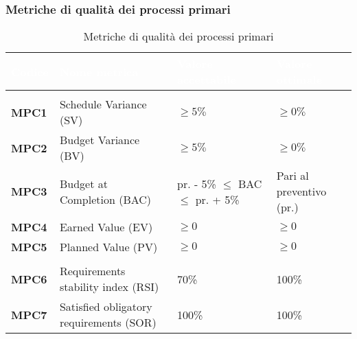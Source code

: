 \subsubsection{Metriche di qualità dei processi primari}
{
\renewcommand{\arraystretch}{1.5}
\centering
\begin{longtable}{C{2.5cm} C{4cm} C{5cm} C{3.5cm}}
\textcolor{white}{\textbf{Codice}}&
\textcolor{white}{\textbf{Nome metrica}}&
\textcolor{white}{\textbf{Valore accettabile}}&
\textcolor{white}{\textbf{Valore ottimale}}\\	
\hline
{}
 \\
\endhead

\endfoot
{}\caption{Metriche di qualità dei processi primari}
\endlastfoot

\textbf{MPC1} & Schedule Variance (SV) & $\geq 5\%$ & $\geq 0\%$ \\
\textbf{MPC2} & Budget Variance (BV) & $\geq 5\%$ & $\geq 0\%$ \\
\textbf{MPC3} & Budget at Completion (BAC) & pr. - 5\% $ \leq $ BAC $ \leq $ pr. + 5\% & Pari al preventivo (pr.)  \\
\textbf{MPC4} & Earned Value (EV) & $\geq 0$  & $\geq 0$ \\
\textbf{MPC5} & Planned Value (PV) & $\geq 0$  & $\geq 0$ \\
 \\
\textbf{MPC6} & Requirements stability index (RSI) & 70\% & 100\% \\
\textbf{MPC7} & Satisfied obligatory requirements (SOR) & 100\% & 100\%
\end{longtable}
}


